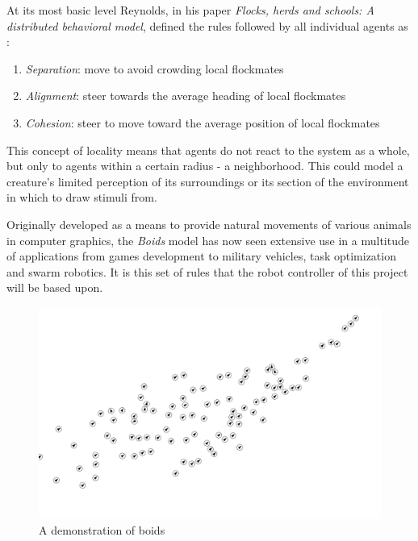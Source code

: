 At its most basic level Reynolds, in his paper \textit{Flocks, herds and schools: A distributed behavioral model}, defined the rules followed by all individual agents as \cite{Reynolds:1987:FHS:37402.37406}:

\begin{enumerate}
	\item \textit{Separation}: move to avoid crowding local flockmates
	\item \textit{Alignment}: steer towards the average heading of local flockmates
	\item \textit{Cohesion}: steer to move toward the average position of local flockmates
\end{enumerate}

This concept of locality means that agents do not react to the system as a whole, but only to agents within a certain radius - a neighborhood. This could model a creature’s limited perception of its surroundings or its section of the environment in which to draw stimuli from.

Originally developed as a means to provide natural movements of various animals in computer graphics,
the \textit{Boids} model has now seen extensive use in a multitude of applications from games development to military vehicles, task optimization and swarm robotics. It is this set of rules that the robot controller of this project will be based upon.

\begin{figure}[h]
	\centering
	\includegraphics[width=1\textwidth]{boids}
	\caption{\label{fig:boid}A demonstration of boids}
\end{figure}